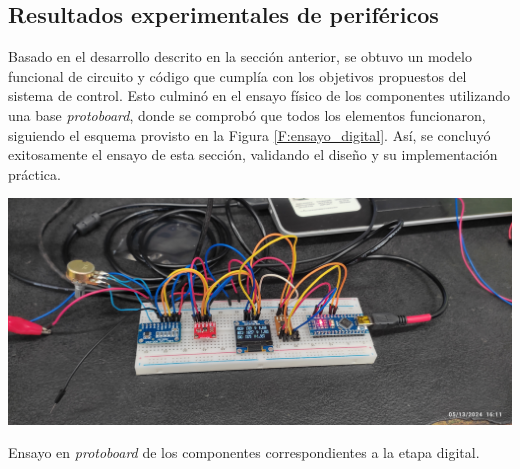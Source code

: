 \subsection{Resultados experimentales de periféricos}
Basado en el desarrollo descrito en la sección anterior, se obtuvo un modelo funcional de circuito y código que cumplía con los objetivos propuestos del sistema de control. Esto culminó en el ensayo físico de los componentes utilizando una base \textit{protoboard}, donde se comprobó que todos los elementos funcionaron, siguiendo el esquema provisto en la Figura \ref{F:ensayo_digital}. Así, se concluyó exitosamente el ensayo de esta sección, validando el diseño y su implementación práctica.\par
\begin{foto}[H]
    \centering
    \includegraphics[scale=0.08]{./imagenes/ensayo_digital.jpg}
    \caption{Ensayo en \textit{protoboard} de los componentes correspondientes a la etapa digital.}
    \label{F:ensayo_digital}
\end{foto}

